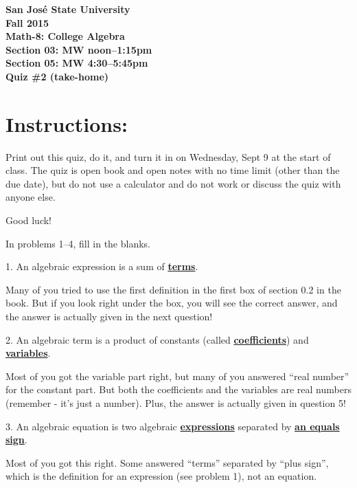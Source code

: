 \documentclass[letterpaper, 12pt]{article}
\begin{document}
\begin{center}
\bfseries
San Jos\'{e} State University \\
Fall 2015 \\
Math-8: College Algebra \\
Section 03: MW noon--1:15pm \\
Section 05: MW 4:30--5:45pm \\
\bigskip
Quiz \#2 (take-home)
\end{center}

\section*{Instructions:}

Print out this quiz, do it, and turn it in on Wednesday, Sept 9 at the start of
class. The quiz is open book and open notes with no time limit (other than the
due date), but do not use a calculator and do not work or discuss the quiz with
anyone else.

\bigskip

Good luck!

\bigskip

In problems 1--4, fill in the blanks.

\newcommand{\answer}[1]{\textbf{\underline{#1}}}

\bigskip

1. An algebraic expression is a sum of \answer{terms}.

\bigskip

Many of you tried to use the first definition in the first box of section 0.2
in the book. But if you look right under the box, you will see the correct
answer, and the answer is actually given in the next question!

\bigskip

2. An algebraic term is a product of constants (called \answer{coefficients})
and \answer{variables}.

\bigskip

Most of you got the variable part right, but many of you answered
``real number'' for the constant part.  But both the coefficients and the
variables are real numbers (remember - it's just a number).  Plus, the answer
is actually given in question 5!

\bigskip

3. An algebraic equation is two algebraic \answer{expressions} separated by
\answer{an equals sign}.

\bigskip

Most of you got this right.  Some answered ``terms'' separated by
``plus sign'', which is the definition for an expression (see problem 1), not
an equation.
\end{document}
